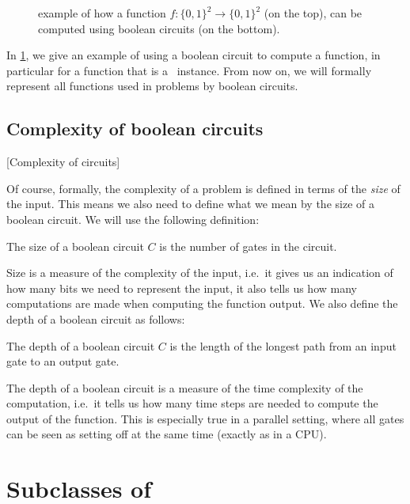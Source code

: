 \begin{figure}
    \centering
    \caption[Computing a function with circuits]{example of how a function $f : \{0, 1\}^2 \rightarrow \{0, 1\}^2$ (on the top), can be computed using boolean circuits (on the bottom).}
    \label{fig:computing_function_example}
\end{figure}

In \cref{fig:computing_function_example}, we give an example of using a boolean circuit to compute a function, in particular for a function that is a \Tarski\ instance. From now on, we will formally represent all functions used in problems by boolean circuits.

\subsection{Complexity of boolean circuits}[Complexity of circuits]

Of course, formally, the complexity of a problem is defined in terms of the \emph{size} of the input. This means we also need to define what we mean by the size of a boolean circuit. We will use the following definition:

\begin{definition}
    The size of a boolean circuit $C$ is the number of gates in the circuit.
\end{definition}

Size is a measure of the complexity of the input, i.e.\ it gives us an indication of how many bits we need to represent the input, it also tells us how many computations are made when computing the function output. We also define the depth of a boolean circuit as follows:

\begin{definition}
    The depth of a boolean circuit $C$ is the length of the longest path from an input gate to an output gate.
\end{definition}

The depth of a boolean circuit is a measure of the time complexity of the computation, i.e.\ it tells us how many time steps are needed to compute the output of the function. This is especially true in a parallel setting, where all gates can be seen as setting off at the same time (exactly as in a CPU).

\section{Subclasses of \TFNP}

